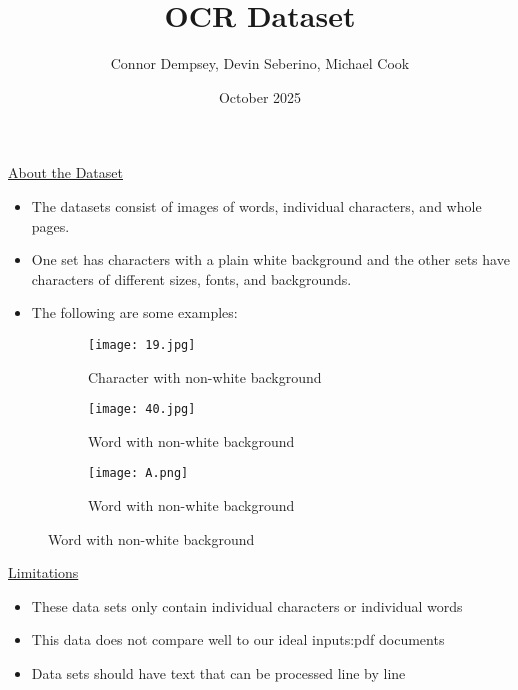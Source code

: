 \documentclass{article}
\title{OCR Dataset}
\author{Connor Dempsey, Devin Seberino, Michael Cook}
\date{October 2025}
\begin{document}
\maketitle

\underline{About the Dataset}

\begin{itemize}
    \item The datasets consist of images of words, individual characters, and whole pages.
    \item One set has characters with a plain white background and the other sets have characters of different sizes, fonts, and backgrounds.
    \item The following are some examples:
\end{itemize}

\begin{figure}[h]

        \begin{subfigure}{0.5\textwidth}
        \texttt{[image: 19.jpg]} 
        \caption{Character with non-white background}
        \label{fig:subim1}
        \end{subfigure}
        \begin{subfigure}{0.5\textwidth}
        \texttt{[image: 40.jpg]}
        \caption{Word with non-white background}
        \label{fig:subim2}
        \end{subfigure}
        \begin{subfigure}{0.5\textwidth}
        \texttt{[image: A.png]}
        \caption{Word with non-white background}
        \label{fig:subim2}
        \end{subfigure}


\end{figure}

\underline{Limitations}
\begin{itemize}
    \item These data sets only contain individual characters or individual words
    \item This data does not compare well to our ideal inputs:pdf documents
    \item Data sets should have text that can be processed line by line
\end{itemize}
\end{document}
